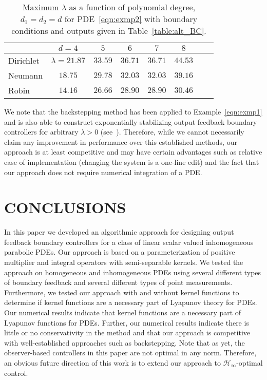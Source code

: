 \documentclass[US letter, 9 pt, conference]{ieeeconf}  \usepackage{setspace}
\newcommand{\mcl}[1]{\mathcal{#1}}
\begin{document}
\begin{table}{}
\caption{Maximum $\lambda$ as a function of polynomial degree, $d_1=d_2=d$ for PDE~\eqref{eqn:exmp2} with boundary conditions and outputs given in Table~\ref{table:alt_BC}.}
\begin{center}
    \begin{tabular}{l *{7}{c}}\hline
  &$d=4$ & $5$ & $6$ & $7$ & $8$  \\ \hline
  Dirichlet & $\lambda=21.87$ & $33.59$ & $36.71$ & $36.71$ & $44.53$   \\
  Neumann & $18.75$ & $29.78$ & $32.03$ & $32.03$ & $39.16$ \\
  Robin & $14.16$ & $26.66$ & $28.90$ & $28.90$ & $30.46$ \\
\end{tabular}
\end{center}
\label{table:alt:cont2}
\end{table}

We note that the backstepping method has been applied to Example~\eqref{eqn:exmp1} and is also able to construct exponentially stabilizing output feedback boundary controllers for arbitrary $\lambda>0$ (see~\cite{krstic2008adaptive}). Therefore, while we cannot necessarily claim any improvement in performance over this established methods, our approach is at least competitive and may have certain advantages such as relative ease of implementation (changing the system is a one-line edit) and the fact that our approach does not require numerical integration of a PDE.
\section{CONCLUSIONS}
In this paper we developed an algorithmic approach for designing output feedback boundary controllers for a class of linear scalar valued inhomogeneous parabolic PDEs. Our approach is based on a parameterization of positive multiplier and integral operators with semi-separable kernels. We tested the approach on homogeneous and inhomogeneous PDEs using several different types of boundary feedback and several different types of point measurements. Furthermore, we tested our approach with and without kernel functions to determine if kernel functions are a necessary part of Lyapunov theory for PDEs. Our numerical results indicate that kernel functions are a necessary part of Lyapunov functions for PDEs. Further, our numerical results indicate there is little or no conservativity in the method and that our approach is competitive with well-established approaches such as backstepping.
Note that as yet, the observer-based controllers in this paper are not optimal in any norm. Therefore, an obvious future direction of this work is to extend our approach to $\mcl{H}_\infty$-optimal control.
\end{document}
